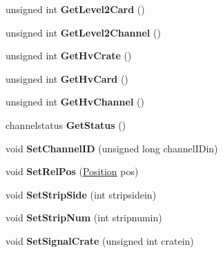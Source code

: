 \begin{DoxyCompactItemize}
\item 
\hypertarget{classChannel_a8664e03b00cfb5d9089ffc730ad2db8a}{unsigned int {\bfseries Get\-Level2\-Card} ()}\label{classChannel_a8664e03b00cfb5d9089ffc730ad2db8a}

\item 
\hypertarget{classChannel_a3d15a263e8282224e6cac3e39fc537e2}{unsigned int {\bfseries Get\-Level2\-Channel} ()}\label{classChannel_a3d15a263e8282224e6cac3e39fc537e2}

\item 
\hypertarget{classChannel_a976eb5f1f568d25d7e6581e947c9026a}{unsigned int {\bfseries Get\-Hv\-Crate} ()}\label{classChannel_a976eb5f1f568d25d7e6581e947c9026a}

\item 
\hypertarget{classChannel_a77afff8e584d72b11c326d503af8cf31}{unsigned int {\bfseries Get\-Hv\-Card} ()}\label{classChannel_a77afff8e584d72b11c326d503af8cf31}

\item 
\hypertarget{classChannel_ab0be6e53cc497a9adfd07d117bd1b8a6}{unsigned int {\bfseries Get\-Hv\-Channel} ()}\label{classChannel_ab0be6e53cc497a9adfd07d117bd1b8a6}

\item 
\hypertarget{classChannel_a0de7daf81b2cf2931ad002365b4e83a7}{channelstatus {\bfseries Get\-Status} ()}\label{classChannel_a0de7daf81b2cf2931ad002365b4e83a7}

\item 
\hypertarget{classChannel_abc8868d1474907bf055649280aee6ee9}{void {\bfseries Set\-Channel\-I\-D} (unsigned long channel\-I\-Din)}\label{classChannel_abc8868d1474907bf055649280aee6ee9}

\item 
\hypertarget{classChannel_a1ce153da74e56914bfe92f1300d9c4db}{void {\bfseries Set\-Rel\-Pos} (\hyperlink{classPosition}{Position} pos)}\label{classChannel_a1ce153da74e56914bfe92f1300d9c4db}

\item 
\hypertarget{classChannel_a2e0a7f64af8639f223be6ae34ee1c866}{void {\bfseries Set\-Strip\-Side} (int stripsidein)}\label{classChannel_a2e0a7f64af8639f223be6ae34ee1c866}

\item 
\hypertarget{classChannel_a1f6b1314cb1db51fd36ed6a734d46af8}{void {\bfseries Set\-Strip\-Num} (int stripnumin)}\label{classChannel_a1f6b1314cb1db51fd36ed6a734d46af8}

\item 
\hypertarget{classChannel_ac7c8bc08322263962606adcee41e5fb9}{void {\bfseries Set\-Signal\-Crate} (unsigned int cratein)}\label{classChannel_ac7c8bc08322263962606adcee41e5fb9}


\end{DoxyCompactItemize}
